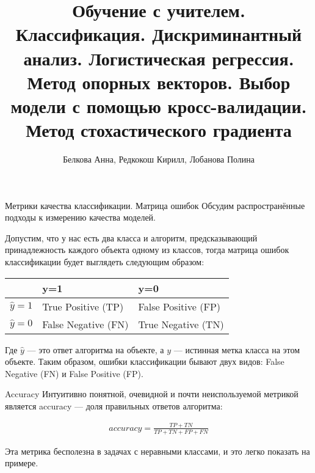 \documentclass[11pt]{beamer}
\begin{document}
	\title[Классификация]{Обучение с учителем. Классификация. Дискриминантный анализ. Логистическая регрессия. Метод опорных векторов. Выбор модели с помощью кросс-валидации. Метод стохастического градиента}
	\author{Белкова Анна, Редкокош Кирилл, Лобанова Полина}
	

\begin{frame}
\titlepage 

\end{frame}

\begin{frame}{Метрики качества классификации. Матрица ошибок}
	Обсудим распространённые подходы к измерению качества моделей.
	
	Допустим, что у нас есть два класса и алгоритм, предсказывающий принадлежность каждого объекта одному из классов, тогда матрица ошибок классификации будет выглядеть следующим образом:
	
	\begin{table}[hhh]
		\begin{tabular}{|l|l|l|}
			\hline
			& y=1                 & y=0                 \\ \hline
			$\hat y = 1$ & True Positive (TP)  & False Positive (FP) \\ \hline
			$\hat y = 0$ & False Negative (FN) & True Negative (TN) \\ \hline
		\end{tabular}
	\end{table}
	
	Где $\hat y$ — это ответ алгоритма на объекте, а $y$ — истинная метка класса на этом объекте.
	Таким образом, ошибки классификации бывают двух видов: False Negative (FN) и False Positive (FP).
	
\end{frame}

\begin{frame}{Accuracy}
	Интуитивно понятной, очевидной и почти неиспользуемой метрикой является accuracy — доля правильных ответов алгоритма:
	
	\begin{align*}
		accuracy = \frac{TP + TN}{TP + TN + FP + FN}
	\end{align*}
	
	Эта метрика бесполезна в задачах с неравными классами, и это легко показать на примере.
	
\end{frame}
\end{document}
